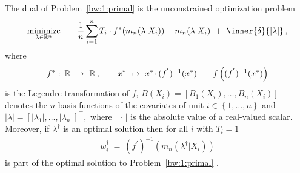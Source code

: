 \begin{ftheorem*}
  The dual of Problem~\ref{bw:1:primal} is the unconstrained optimization problem 
  \begin{gather*}
    \underset{\lambda \in \R^n}{\mathrm{minimize}}
    \qquad
    \frac{1}{n}
    \sum_{i = 1}^{n} 
    T_i 
    \cdot
    f^*
    (
      m_n(\lambda|X_i)
    )
    -
      m_n(\lambda|X_i)
    \ 
    +
    \ 
    \inner{\delta}{\left| \lambda \right|}
    \,,
  \end{gather*}
  where
  \begin{gather*}
  f^*
  \,
  \colon
  \, 
  \R
  \ 
  \to
  \ 
  \R
  \,
  ,
  \qquad 
  x^*
  \ 
  \mapsto
  \ 
    x^*
    \!
    \cdot
    (f^{'})^{-1}(x^*)
  \ 
    -
  \ 
    f
    \left( 
      (f^{'})^{-1}(x^*)
    \right)
  \end{gather*}
  is the Legendre transformation of $f$,
  $
    B(X_i)
    =
    \left[ 
      B_1(X_i)
      ,
      \ldots
      ,
      B_n(X_i)
    \right]
    ^\top
  $
  denotes the $n$ basis functions of the covariates 
  of unit $i\in \left\{ 1, \ldots, n \right\}$
  and
  $
    \left| \lambda \right|
    =
    \left[ 
      \left| \lambda_1 \right|
      ,
      \ldots
      ,
      \left| \lambda_n \right|
    \right]
    ^\top
    ,
  $
  where $\left| \,\cdot\, \right|$
  is the absolute value of a real-valued scalar.
  Moreover, if $\lambda^\dagger$
  is an optimal solution then
  for all $i$ with $T_i=1$
  \begin{gather*}
    w_i^\dagger
    \ 
    =
    \ 
    (f^{'})^{-1}
    \left( 
      m_n
      (
      \lambda^\dagger
      |
      X_i
      )
    \right)
  \end{gather*}
  is part of the optimal solution to 
  Problem~\ref{bw:1:primal}
  .
\end{ftheorem*}
